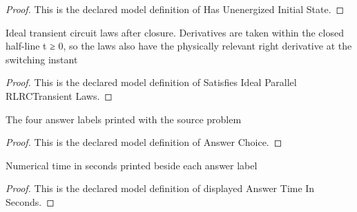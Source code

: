 \begin{proof}
  This is the declared model definition of Has Unenergized Initial State.
\end{proof}
\begin{definition}
  \label{def:physics:phyx-mini-0991:phyxminiproblems-problemphyxmini0991-satisfiesidealparallelrlrctransientlaws}
  Ideal transient circuit laws after closure. Derivatives are taken within the closed half-line t ≥ 0, so the laws also have the physically relevant right derivative at the switching instant
\end{definition}
\begin{proof}
  This is the declared model definition of Satisfies Ideal Parallel RLRCTransient Laws.
\end{proof}
\begin{definition}
  \label{def:physics:phyx-mini-0991:phyxminiproblems-problemphyxmini0991-answerchoice}
  The four answer labels printed with the source problem
\end{definition}
\begin{proof}
  This is the declared model definition of Answer Choice.
\end{proof}
\begin{definition}
  \label{def:physics:phyx-mini-0991:phyxminiproblems-problemphyxmini0991-displayedanswertimeinseconds}
  Numerical time in seconds printed beside each answer label
\end{definition}
\begin{proof}
  This is the declared model definition of displayed Answer Time In Seconds.
\end{proof}
